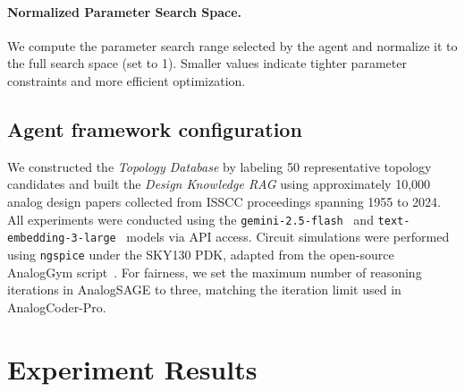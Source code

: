 \documentclass[sigconf,nonacm]{acmart}
\begin{document}
\paragraph{Normalized Parameter Search Space.}
We compute the parameter search range selected by the agent and normalize it to the full search space (set to 1). Smaller values indicate tighter parameter constraints and more efficient optimization.


\subsection{Agent framework configuration}


We constructed the \emph{Topology Database} by labeling 50 representative topology candidates and built the \emph{Design Knowledge RAG} using approximately 10,000 analog design papers collected from ISSCC proceedings \cite{issccISSCCInternational} spanning 1955 to 2024. All experiments were conducted using the \texttt{gemini-2.5-flash}~\cite{comanici2025gemini} and \texttt{text-embedding-3-large}~\cite{neelakantan2022text} models via API access. Circuit simulations were performed using \texttt{ngspice} under the SKY130 PDK, adapted from the open-source AnalogGym script~\cite{10.1145/3676536.3697117}.
For fairness, we set the maximum number of reasoning iterations in AnalogSAGE to three, matching the iteration limit used in AnalogCoder-Pro.




\section{Experiment Results}



\begin{table}[]
    \centering
    \caption{Pass@1 comparison between proposed AnalogSAGE and baselines.}
    \label{tab:baseline_vs_full}
\end{table}
\end{document}
